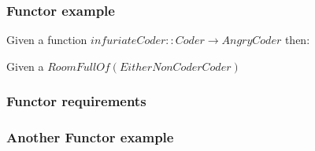 \documentclass{beamer}
\begin{document}
\begin{frame}
  \frametitle{Functor example}

  Given a function $infuriateCoder :: Coder \to AngryCoder$ then:




  Given a $RoomFullOf (Either NonCoder Coder)$


\end{frame}


\begin{frame}
  \frametitle{Functor requirements}



\end{frame}


\begin{frame}
  \frametitle{Another Functor example}




\end{frame}
\end{document}
